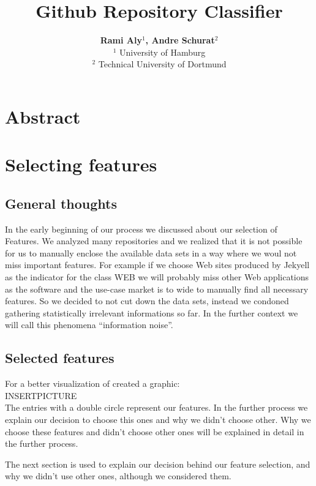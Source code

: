 \documentclass[paper=A4,pagesize=auto,12pt,headinclude=true,footinclude=true,BCOR=0mm,DIV=calc]{scrartcl}
\begin{document}
	
	\title{Github Repository Classifier}
	\author{\textbf{Rami Aly$^{1}$, Andre Schurat}$^{2}$\\
		$^{1}$ University of Hamburg\\
		$^{2}$ Technical University of Dortmund}
	\maketitle
	
	\newpage
	
	\section{Abstract}
	
	
	\newpage
	
	\tableofcontents 
	
	\newpage
	\section{Selecting features} 
	\subsection{General thoughts}
	In the early beginning of our process we discussed about our selection of Features. We analyzed many repositories and  we realized that it is not possible for us to manually enclose the available data sets in a way where we woul not miss important features. For example if we choose Web sites produced by Jekyell as the indicator for the class WEB we will probably miss other Web applications as the software and the use-case market is to wide to manually find all necessary features. So we decided to not cut down the data sets, instead we condoned gathering statistically irrelevant informations so far. In the further context we will call this phenomena “information noise”.
	\subsection{Selected features}
	For a better visualization of  created a graphic:
	\\
	INSERTPICTURE
	\\
	The entries with a double circle represent our features. In the further process we explain our decision to choose this ones and why we didn’t choose other.
	Why we choose these features and didn’t choose other ones will be explained in detail in the further process.
	
	The next section is used to explain our decision behind our feature selection, and why we didn’t use other ones, although we considered them. 
	
\end{document}
